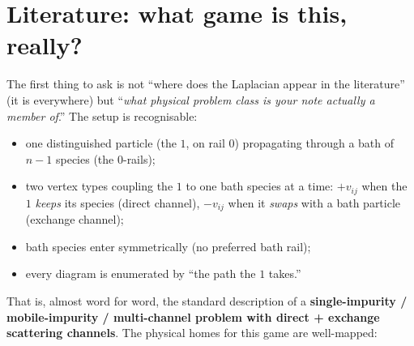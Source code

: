 \documentclass[11pt,a4paper]{article}
\newcommand{\hl}[1]{\colorbox{gunnaryellow}{$#1$}}
\begin{document}
\section{Literature: what game is this, really?}\label{sec:lit}

\begingroup\sloppy

The first thing to ask is not ``where does the Laplacian appear in the
literature'' (it is everywhere) but ``\emph{what physical problem class is
your note actually a member of}.'' The setup is recognisable:
\begin{itemize}[leftmargin=2em,itemsep=1pt]
  \item one distinguished particle (the $1$, on rail $0$) propagating
        through a bath of $n{-}1$ species (the $0$-rails);
  \item two vertex types coupling the $1$ to one bath species at a time:
        \hl{+v_{ij}} when the $1$ \emph{keeps} its species (direct
        channel), \hl{-v_{ij}} when it \emph{swaps} with a bath particle
        (exchange channel);
  \item bath species enter symmetrically (no preferred bath rail);
  \item every diagram is enumerated by ``the path the $1$ takes.''
\end{itemize}
That is, almost word for word, the standard description of a
\textbf{single-impurity / mobile-impurity / multi-channel problem with
direct + exchange scattering channels}. The physical homes for this game
are well-mapped:
\end{document}
